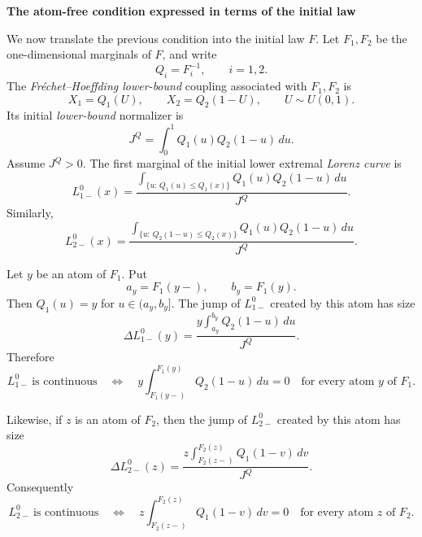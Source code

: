 \documentclass[onecolumn]{article}
\begin{document}
\begin{flushleft}
\bigskip \textbf{The atom-free condition expressed in terms of the initial
law}
\end{flushleft}

We now translate the previous condition into the initial law $F$. Let $%
F_{1},F_{2}$ be the one-dimensional marginals of $F$, and write 
\begin{equation*}
Q_{i}=F_{i}^{-1},\qquad i=1,2.
\end{equation*}%
The \textit{Fr\'{e}chet--Hoeffding lower-bound} coupling associated with $%
F_{1},F_{2}$ is 
\begin{equation*}
X_{1}=Q_{1}(U),\qquad X_{2}=Q_{2}(1-U),\qquad U\sim U(0,1).
\end{equation*}%
Its initial \textit{lower-bound} normalizer is 
\begin{equation}
J^{Q}=\int_{0}^{1}Q_{1}(u)Q_{2}(1-u)\,du.  \label{eq:atomic-J0}
\end{equation}%
Assume $J^{Q}>0$. The first marginal of the initial lower extremal \textit{%
Lorenz curve} is 
\begin{equation}
L_{1-}^{0}(x)=\frac{\int_{\{u:\,Q_{1}(u)\leq
Q_{1}(x)\}}Q_{1}(u)Q_{2}(1-u)\,du}{J^{Q}}.  \label{eq:atomic-L10-F}
\end{equation}%
Similarly, 
\begin{equation}
L_{2-}^{0}(x)=\frac{\int_{\{u:\,Q_{2}(1-u)\leq
Q_{2}(x)\}}Q_{1}(u)Q_{2}(1-u)\,du}{J^{Q}}.  \label{eq:atomic-L20-F}
\end{equation}

Let $y$ be an atom of $F_{1}$. Put 
\begin{equation*}
a_{y}=F_{1}(y-),\qquad b_{y}=F_{1}(y).
\end{equation*}%
Then $Q_{1}(u)=y$ for $u\in (a_{y},b_{y}]$. The jump of $L_{1-}^{0}$ created
by this atom has size 
\begin{equation}
\Delta L_{1-}^{0}(y)=\frac{y\int_{a_{y}}^{b_{y}}Q_{2}(1-u)\,du}{J^{Q}}.
\label{eq:atomic-L10-jump}
\end{equation}%
Therefore 
\begin{equation}
L_{1-}^{0}\ \text{is continuous}\quad \Longleftrightarrow \quad
y\int_{F_{1}(y-)}^{F_{1}(y)}Q_{2}(1-u)\,du=0\quad \text{for every atom }y%
\text{ of }F_{1}.  \label{eq:atomic-L10-continuity-equivalence}
\end{equation}

Likewise, if $z$ is an atom of $F_{2}$, then the jump of $L_{2-}^{0}$
created by this atom has size 
\begin{equation}
\Delta L_{2-}^{0}(z)=\frac{z\int_{F_{2}(z-)}^{F_{2}(z)}Q_{1}(1-v)\,dv}{J^{Q}}%
.  \label{eq:atomic-L20-jump}
\end{equation}%
Consequently 
\begin{equation}
L_{2-}^{0}\ \text{is continuous}\quad \Longleftrightarrow \quad
z\int_{F_{2}(z-)}^{F_{2}(z)}Q_{1}(1-v)\,dv=0\quad \text{for every atom }z%
\text{ of }F_{2}.  \label{eq:atomic-L20-continuity-equivalence}
\end{equation}
\end{document}
